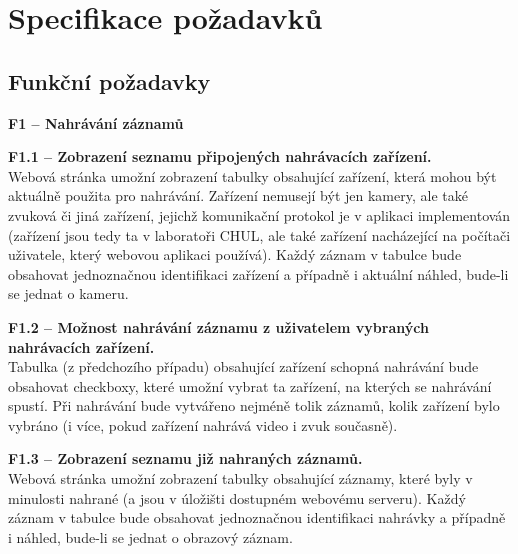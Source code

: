 \documentclass[thesis=M,czech]{FITthesis}[2012/06/26]
\begin{document}
\section{Specifikace požadavků} \label{sec:analyza_pozadavky}
\subsection{Funkční požadavky} \label{subsec:analyza_fp}
\begin{description}
  \item \textbf{F1 -- Nahrávání záznamů}
  \begin{description}
    \item \textbf{F1.1 -- Zobrazení seznamu připojených nahrávacích zařízení.\\}
	Webová stránka umožní zobrazení tabulky obsahující zařízení, která mohou být aktuálně použita pro nahrávání. Zařízení nemusejí být jen kamery, ale také zvuková či jiná zařízení, jejichž komunikační protokol je v aplikaci implementován (zařízení jsou tedy ta v laboratoři CHUL, ale také zařízení nacházející na počítači uživatele, který webovou aplikaci používá). Každý záznam v tabulce bude obsahovat jednoznačnou identifikaci zařízení a případně i aktuální náhled, bude-li se jednat o kameru.
    \item \textbf{F1.2 -- Možnost nahrávání záznamu z uživatelem vybraných nahrávacích zařízení.\\}
	Tabulka (z předchozího případu) obsahující zařízení schopná nahrávání bude obsahovat checkboxy, které umožní vybrat ta zařízení, na kterých se nahrávání spustí. Při nahrávání bude vytvářeno nejméně tolik záznamů, kolik zařízení bylo vybráno (i více, pokud zařízení nahrává video i zvuk současně).
    \item \textbf{F1.3 -- Zobrazení seznamu již nahraných záznamů.\\}
	Webová stránka umožní zobrazení tabulky obsahující záznamy, které byly v minulosti nahrané (a jsou v úložišti dostupném webovému serveru). Každý záznam v tabulce bude obsahovat jednoznačnou identifikaci nahrávky a případně i náhled, bude-li se jednat o obrazový záznam.

  \end{description}


\end{description}
\end{document}
